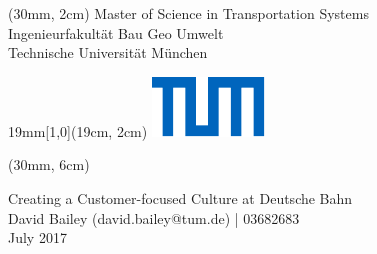 \begin{titlepage}
\def\coverborderleft{30mm}

\begin{textblock*}{\textwidth}(\coverborderleft, 2cm)
\noindent
\textcolor{UniversitaetFarbe} {
  \fontsize{9}{11}\selectfont
  \sffamily Master of Science in Transportation Systems\\
  \sffamily Ingenieurfakultät Bau Geo Umwelt\\
  \sffamily Technische Universität München}
\end{textblock*}

\begin{textblock*}{19mm}[1,0](19cm, 2cm)
  \includegraphics{TUM_blau.pdf}
\end{textblock*}

\begin{textblock*}{\paperwidth}(\coverborderleft, 6cm)
\raggedright
  \sffamily \huge{Creating a Customer-focused Culture at Deutsche Bahn} \\
  \sffamily \Large{David Bailey (david.bailey@tum.de) | 03682683}\\
  \sffamily \large{July 2017}\\
\end{textblock*}
~\\
\end{titlepage}

